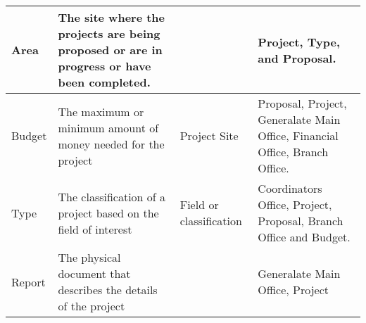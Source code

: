 \documentclass{article}
\begin{document}
\begin{longtable}{|p{}|p{} |p{}|p{}|}
Area & The site where the projects are being proposed or are in progress or have been completed. & & Project, Type, and Proposal.  \\\hline
Budget & The maximum or minimum amount of money needed for the project  & Project Site  & Proposal, Project, Generalate Main Office, Financial Office, Branch Office. \\\hline
Type & The classification of a project based on the field of interest & Field or classification & Coordinators Office, Project, Proposal, Branch Office and Budget. \\\hline
Report & The physical document that describes the details of the project  & & Generalate Main Office, Project \\\hline




\end{longtable}
\end{document}

